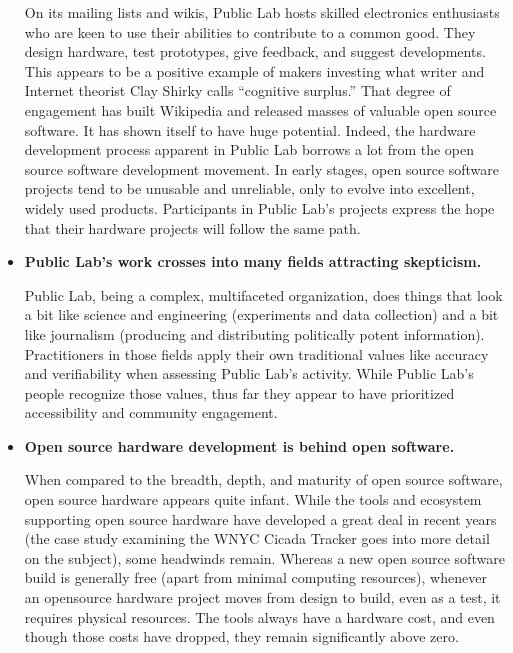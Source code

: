 \begin{itemize}
On its mailing lists and wikis, Public Lab hosts skilled electronics
enthusiasts who are keen to use their abilities to contribute to a common
good. They design hardware, test prototypes, give feedback, and
suggest developments. This appears to be a positive example of makers
investing what writer and Internet theorist Clay Shirky calls ``cognitive
surplus.'' That degree of engagement has built Wikipedia and
released masses of valuable open source software. It has shown itself
to have huge potential. Indeed, the hardware development process
apparent in Public Lab borrows a lot from the open source software
development movement. In early stages, open source software projects
tend to be unusable and unreliable, only to evolve into excellent,
widely used products. Participants in Public Lab's projects express the
hope that their hardware projects will follow the same path.
\item \textbf{Public Lab's work crosses into many fields attracting skepticism.}

Public Lab, being a complex, multifaceted organization, does things
that look a bit like science and engineering (experiments and data collection)
and a bit like journalism (producing and distributing politically
potent information). Practitioners in those fields apply their own
traditional values like accuracy and verifiability when assessing Public
Lab's activity. While Public Lab's people recognize those values,
thus far they appear to have prioritized accessibility and community
engagement.
\item \textbf{Open source hardware development is behind open software.}

When compared to the breadth, depth, and maturity of open source
software, open source hardware appears quite infant. While the tools
and ecosystem supporting open source hardware have developed
a great deal in recent years (the case study examining the WNYC
Cicada Tracker goes into more detail on the subject), some headwinds
remain. Whereas a new open source software build is generally
free (apart from minimal computing resources), whenever an opensource hardware project moves from design to build, even as a test,
it requires physical resources. The tools always have a hardware cost,
and even though those costs have dropped, they remain significantly
above zero.
\end{itemize}
